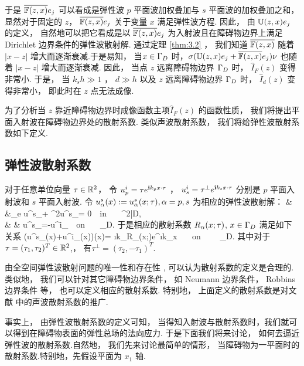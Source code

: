 {于是 $\overline{\mathbb{F}(z,x)}e_j$ 可以看成是弹性波 $p$ 平面波加权叠加与 $s$ 平面波的加权叠加之和， 显然对于固定的 $z$， $\overline{\mathbb{F}(z,x)}e_j$ 关于变量 $x$ 满足弹性波方程. 因此， 由 $\mathbb{U}(z,x)e_j$ 的定义， 自然地可以把它看成是以 $\overline{\mathbb{F}(z,x)}e_j$ 为入射波且在障碍物边界上满足 Dirichlet 边界条件的弹性波散射解. 通过定理 \ref{thm:3.2} ， 我们知道 $\overline{\mathbb{F}(z,x)}$ 随着 $|x-z|$ 增大而逐渐衰减.于是易知， 当$x\in \Gamma_D$ 时，$\sigma(\mathbb{U}(z,x)e_j+\overline{\mathbb{F}(z,x)}e_j)\nu$ 也随着 $|x-z|$ 增大而逐渐衰减. 因此， 当点 $z$ 远离障碍物边界 $\Gamma_D$ 时， $\hat{I}_F(z)$ 变得非常小. 于是， 当 $k_s h \gg 1$ ， $d\gg h$ 以及 $z$ 远离障碍物边界 $\Gamma_D$ 时， $\hat{I}_d(z)$ 变得非常小， 即此时在 $z$ 点无法成像.

为了分析当 $z$ 靠近障碍物边界时成像函数主项$\hat{I}_F(z)$ 的函数性质， 我们将提出平面入射波在障碍物边界处的散射系数. 类似声波散射系数， 我们将给弹性波散射系数如下定义.
\subsection{弹性波散射系数}
\begin{definition}\label{scarr_con}
	对于任意单位向量 $\tau\in \mathbb{R}^2$， 令 $u^i_p =\tau e^{\mathbf{i} k_p x\cdot \tau}$ ，  $u^i_s= \tau^\perp e^{\mathbf{i} k_s x\cdot \tau}$ 分别是 $p$ 平面入射波和 $s$ 平面入射波.   令 $u^s_\alpha (x) := u^s_\alpha(x;\tau), \alpha=p,s$ 为相应的弹性波散射解：
	\be\label{sc1}
	& &\De_e u^s_\alpha + \om^2u^s_\alpha = 0\ \ \mbox{in }   \ \ \R^2\bks\bar{D}, \ \ \ \  \\
	& & u^s_\alpha =-u^i_\alpha \ \ \mbox{on }  \ \ \Ga_D.
	\ee
	于是相应的散射系数 $R_\alpha(x;\tau)$, $x\in\Gamma_D$ 满足如下关系
	\ben
	\sigma(u^s_\alpha(x)+u^i_\alpha(x))\nu(x)= \i k_\alpha R_\alpha(x;\tau)e^{\i k_\alpha x\cdot \tau}  \ \ \ \mbox{on } \ \ \  \Ga_D.
	\een
	其中对于 $\tau=(\tau_1,\tau_2)^T\in\mathbb{R}^2$,， 有$\tau^\perp=(\tau_2,-\tau_1)^T$.
\end{definition}
\begin{remark}
	由全空间弹性波散射问题的唯一性和存在性 \cite{cxz2016,ku63}, 可以认为散射系数的定义是合理的. 类似地， 我们可以针对其它障碍物边界条件， 如 Neumann 边界条件， Robbins 边界条件 等， 也可以定义相应的散射系数. 特别地， 上面定义的散射系数是对文献\cite{RTMhalf_aco} 中的声波散射系数的推广.
\end{remark}

事实上， 由弹性波散射系数的定义可知， 当得知入射波与散射系数时，我们就可以得到在障碍物表面的弹性总场的法向应力. 于是下面我们将来讨论， 如何去逼近弹性波的散射系数.自然地， 我们先来讨论最简单的情形， 当障碍物为一平面时的散射系数.特别地，先假设平面为 $x_1$ 轴.


}

